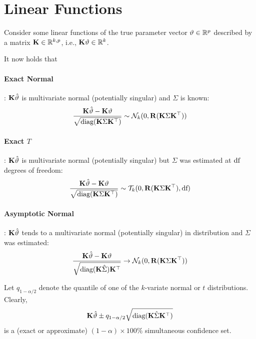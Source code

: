 \documentclass{article}
\begin{document}
\section{Linear Functions}

Consider some linear functions of the true parameter vector $\vartheta \in \mathbb{R}^p$
described by a matrix $\mathbf{K} \in \mathbb{R}^{k,p}$, i.e., $\mathbf{K} \vartheta \in \mathbb{R}^k$.

It now holds that

\paragraph{Exact Normal}: $\mathbf{K} \hat{\vartheta}$ is multivariate normal (potentially singular)
and $\Sigma$ is known:
\begin{eqnarray*}
\frac{\mathbf{K} \hat{\vartheta} - \mathbf{K} \vartheta}{\sqrt{\text{diag}(\mathbf{K} \Sigma \mathbf{K}^\top)}} \sim \mathcal{N}_k(0, \mathbf{R}(\mathbf{K} \Sigma \mathbf{K}^\top))
\end{eqnarray*}

\paragraph{Exact $T$}: $\mathbf{K} \hat{\vartheta}$ is multivariate normal (potentially singular)
but $\Sigma$ was estimated at $\text{df}$ degrees of freedom:
\begin{eqnarray*}
\frac{\mathbf{K} \hat{\vartheta} - \mathbf{K} \vartheta}{\sqrt{\text{diag}(\mathbf{K} \Sigma \mathbf{K}^\top)}} \sim 
    \mathcal{T}_k(0, \mathbf{R}(\mathbf{K} \Sigma \mathbf{K}^\top), \text{df})
\end{eqnarray*}

\paragraph{Asymptotic Normal}: $\mathbf{K} \hat{\vartheta}$ tends
to a multivariate normal (potentially singular) in distribution and $\Sigma$ was estimated:
\begin{eqnarray*}
\frac{\mathbf{K} \hat{\vartheta} - \mathbf{K} \vartheta}{\sqrt{\text{diag}(\mathbf{K} \hat{\Sigma}) \mathbf{K}^\top}} \rightarrow
    \mathcal{N}_k(0, \mathbf{R}(\mathbf{K} \Sigma \mathbf{K}^\top))
\end{eqnarray*}

Let $q_{1 - \alpha/2}$ denote the quantile of one of the $k$-variate normal or
$t$ distributions. Clearly,
\begin{eqnarray*}
\mathbf{K} \hat{\vartheta} \pm q_{1 - \alpha/2} \sqrt{\text{diag}(\mathbf{K} \hat{\Sigma} \mathbf{K}^\top)}
\end{eqnarray*}
is a (exact or approximate) $(1 - \alpha) \times 100\%$ simultaneous confidence set.
\end{document}
